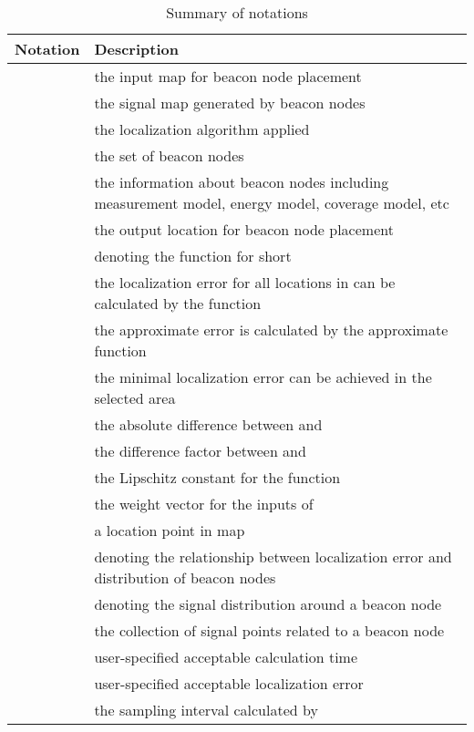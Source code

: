 \documentclass[10pt, conference, letterpaper]{IEEEtran}
\begin{document}
\begin{table}[!t]
\caption{Summary of notations} \label{mc}
\begin{tabularx}{9cm}{|p{2.0cm}|X|}
  \hline
Notation & Description \\
  \hline
   & the input map for beacon node placement \\
  \hline
   & the signal map generated by beacon nodes \\
  \hline
   & the localization algorithm applied \\
  \hline
   & the set of beacon nodes\\
  \hline
   & the information about beacon nodes including measurement model, energy model, coverage model, etc \\
  \hline
   & the output location for beacon node placement \\
  \hline
   & denoting the function  for short \\
  \hline
   & the localization error  for all locations in  can be calculated by the function  \\
  \hline
   & the approximate error  is calculated by the approximate function  \\
  \hline
   & the minimal localization error can be achieved in the selected area \\
  \hline
   & the absolute difference between  and  \\
  \hline
   & the difference factor between  and  \\
  \hline
   & the Lipschitz constant for the function  \\
  \hline
   & the weight vector for the inputs of  \\
  \hline
   & a location point in map  \\
  \hline
   & denoting the relationship between localization error and distribution of beacon nodes \\
  \hline
   & denoting the signal distribution around a beacon node \\
  \hline
   & the collection of signal points related to a beacon node \\
  \hline
   & user-specified acceptable calculation time \\
  \hline
   & user-specified acceptable localization error \\
  \hline
   & the sampling interval calculated by  \\
  \hline
\end{tabularx}
\end{table}
\end{document}
